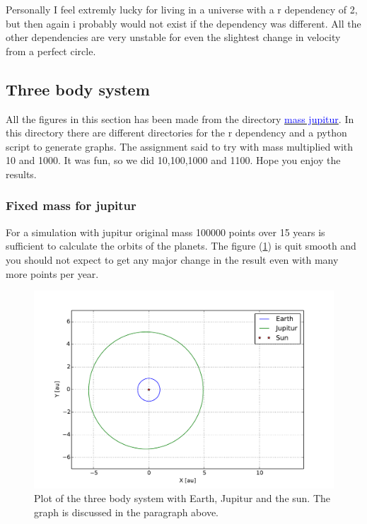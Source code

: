Personally I feel extremly lucky for living in a universe with a r dependency of 2, but then again i probably would not exist if the dependency was different. All the other dependencies are very unstable for even the slightest change in velocity from a perfect circle.


















\subsection{Three body system}

All the figures in this section has been made from the directory \href{https://github.com/erikfsk/Project-3/tree/master/Project3/mass%20jupitur}{\textcolor{blue}{mass jupitur}}. In this directory there are different directories for the r dependency and a python script to generate graphs. The assignment said to try with mass multiplied with 10 and 1000. It was fun, so we did 10,100,1000 and 1100. Hope you enjoy the results. 

\subsubsection{Fixed mass for jupitur}

For a simulation with jupitur original mass 100000 points over 15 years is sufficient to calculate the orbits of the planets. The figure (\ref{fig:three-body}) is quit smooth and you should not expect to get any major change in the result even with many more points per year. 

\begin{figure}[H]
    \centering
    \includegraphics[width=\linewidth]{result/bilder/jupitur-mass.pdf}
    \caption{Plot of the three body system with Earth, Jupitur and the sun. The graph is discussed in the paragraph above. }
    \label{fig:three-body}
\end{figure}


